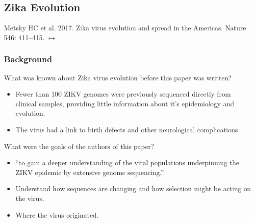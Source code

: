 \documentclass[12pt,a4paper]{article}
\begin{document}
\subsection{Zika Evolution}
{\color{darklc} Metsky HC et al. 2017. Zika virus evolution and spread in the Americas. Nature 546: 411--415. \(\mapsto\)} %
\subsubsection{Background}
\begin{itemize}
    {\color{G-Moon}\item What was known about Zika virus evolution before this paper was written?}
        \begin{itemize}
            \item Fewer than 100 ZIKV genomes were previously sequenced directly from clinical samples, providing little information about it's epidemiology and evolution.
            \item The virus had a link to birth defects and other neurological complications.
        \end{itemize}
    {\color{G-Moon}\item What were the goals of the authors of this paper?}
        \begin{itemize}
            \item ``to gain a deeper understanding of the viral populations underpinning the ZIKV epidemic by extensive genome sequencing.''
            \item Understand how sequences are changing and how selection might be acting on the virus.
            \item Where the virus originated.
        \end{itemize}
\end{itemize}
\end{document}
